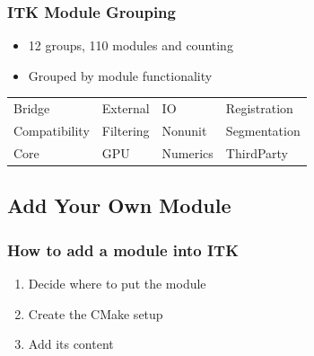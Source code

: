 \begin{frame}
\frametitle{ITK Module Grouping}
\begin{itemize}
\item  12 groups, 110 modules and counting
\pause
\item  Grouped by module functionality
\pause
\end{itemize}
\vskip14pt
\begin{tabular}{llll}
Bridge     &    \alert{External}   & IO        & Registration \\
Compatibility  & Filtering  & Nonunit   & Segmentation \\
Core           & GPU        & Numerics  & ThirdParty \\
\end{tabular}
\end{frame}

\subsection{Add Your Own Module}

\begin{frame}
\frametitle{How to add a module into ITK}
\begin{enumerate}
\item Decide where to put the module
\pause
\item Create the CMake setup
\pause
\item Add its content
\end{enumerate}
\end{frame}



